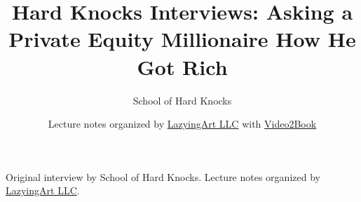 \documentclass[11pt,oneside]{book}
\begin{document}
\frontmatter
\title{Hard Knocks Interviews: Asking a Private Equity Millionaire How He Got Rich}
\author{School of Hard Knocks}
\date{Lecture notes organized by \href{https://lazying.art}{LazyingArt LLC} with \href{https://github.com/lachlanchen/Video2Book}{Video2Book}}
\maketitle
\begin{center}
\small Original interview by School of Hard Knocks. Lecture notes organized by \href{https://lazying.art}{LazyingArt LLC}.
\end{center}
\clearpage
\mainmatter

\end{document}
